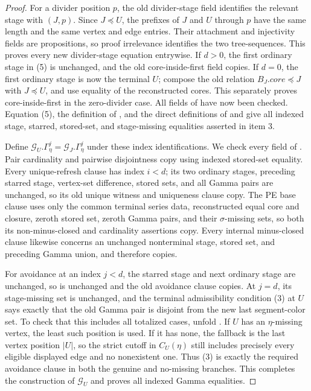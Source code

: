 \begin{proof}
For a divider position $p$, the old divider-stage field identifies the
relevant stage with $(J,p)$.  Since
$J\preccurlyeq U$, the prefixes of $J$ and $U$ through $p$ have the same
length and the same vertex and edge entries.  Their attachment and
injectivity fields are propositions, so proof irrelevance identifies the
two tree-sequences.  This proves every new divider-stage equation
entrywise.  If $d>0$, the first ordinary stage in (5) is unchanged, and
the old core-inside-first field copies.  If $d=0$, the first ordinary stage
is now the terminal $U$; compose the old relation
$B_J.\mathit{core}\preccurlyeq J$ with $J\preccurlyeq U$, and use equality
of the reconstructed cores.  This separately proves core-inside-first in
the zero-divider case.  All fields of  have
now been checked.  Equation (5), the definition of
, and the direct definitions of
 and
 give all indexed stage, starred,
stored-set, and stage-missing equalities asserted in item 3.

Define $\mathcal G_U.\Gamma^j_\eta=\mathcal G_J.\Gamma^j_\eta$ under
these index identifications.  We check every field of
.  Pair cardinality and pairwise disjointness copy
using indexed stored-set equality.  Every unique-refresh clause has index
$i<d$; its two ordinary stages, preceding starred stage, vertex-set
difference, stored sets, and all Gamma pairs are unchanged, so its old
unique witness and uniqueness clause copy.  The PE base clause uses only
the common terminal series data, reconstructed equal core and closure,
zeroth stored set, zeroth Gamma pairs, and their $\sigma$-missing sets, so
both its non-minus-closed and cardinality assertions copy.  Every internal
minus-closed clause likewise concerns an unchanged nonterminal stage,
stored set, and preceding Gamma union, and therefore copies.

For avoidance at an index $j<d$, the starred stage and next ordinary stage
are unchanged, so  is unchanged and the
old avoidance clause copies.  At $j=d$, its stage-missing set is unchanged,
and the terminal admissibility condition (3) at $U$ says exactly that the
old Gamma pair is disjoint from the new last segment-color set.  To check
that this includes all totalized cases, unfold
.  If $U$ has an $\eta$-missing
vertex, the least such position is used.  If it has none, the fallback is
the last vertex position $|U|$, so the strict cutoff in $C_U(\eta)$ still
includes precisely every eligible displayed edge and no nonexistent one.
Thus (3) is exactly the required avoidance clause in both the genuine and
no-missing branches.  This completes the construction of $\mathcal G_U$
and proves all indexed Gamma equalities.


\end{proof}
